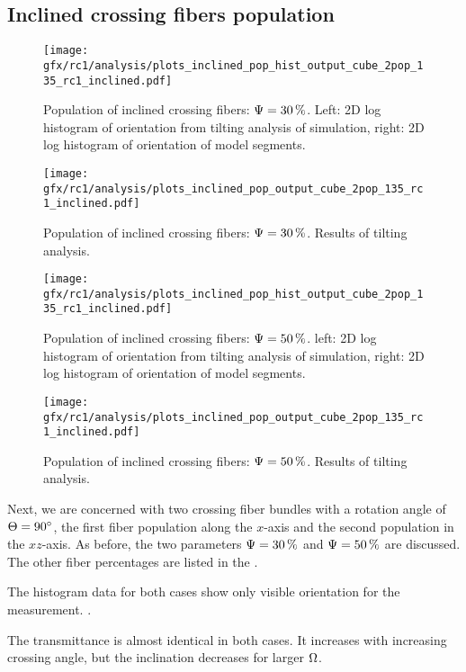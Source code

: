 \subsection{Inclined crossing fibers population}
\label{sec:resInclCross}
%
\begin{figure}[!t]
\centering
\texttt{[image: gfx/rc1/analysis/plots\_inclined\_pop\_hist\_output\_cube\_2pop\_135\_rc1\_inclined.pdf]}
\caption{Population of inclined crossing fibers: $\textnormal{$\Psi$}=\SI{30}{\percent}$. Left: 2D log histogram of orientation from tilting analysis of simulation, right: 2D log histogram of orientation of model segments.}
\label{fig:inclined_03_fiber_pop_hist}
\end{figure}
%
\begin{figure}[!p]
\centering
\texttt{[image: gfx/rc1/analysis/plots\_inclined\_pop\_output\_cube\_2pop\_135\_rc1\_inclined.pdf]}
\caption{Population of inclined crossing fibers: $\textnormal{$\Psi$}=\SI{30}{\percent}$. Results of tilting analysis.}
\label{fig:inclined_03_fiber_pop_rofl}
\end{figure}
%
\begin{figure}[!t]
\centering
\texttt{[image: gfx/rc1/analysis/plots\_inclined\_pop\_hist\_output\_cube\_2pop\_135\_rc1\_inclined.pdf]}
\caption{Population of inclined crossing fibers: $\textnormal{$\Psi$}=\SI{50}{\percent}$. left: 2D log histogram of orientation from tilting analysis of simulation, right: 2D log histogram of orientation of model segments.}
\label{fig:inclined_05_fiber_pop_hist}
\end{figure}
%
\begin{figure}[!p]
\centering
\texttt{[image: gfx/rc1/analysis/plots\_inclined\_pop\_output\_cube\_2pop\_135\_rc1\_inclined.pdf]}
\caption{Population of inclined crossing fibers: $\textnormal{$\Psi$}=\SI{50}{\percent}$. Results of tilting analysis.}
\label{fig:inclined_05_fiber_pop_rofl}
\end{figure}
%
Next, we are concerned with two crossing fiber bundles with a rotation angle of $\textnormal{$\Theta$} = \SI{90}{\degree}$, \ie{} the first fiber population along the $x$-axis and the second population in the $xz$-axis.
As before, the two parameters $\textnormal{$\Psi$} = \SI{30}{\percent}$ and $\textnormal{$\Psi$} = \SI{50}{\percent}$ are discussed.
The other fiber percentages are listed in the .
\par
%
The histogram data for both cases show only visible orientation for the measurement.
\dummy{}.
\par
The transmittance is almost identical in both cases.
It increases with increasing crossing angle, but the inclination decreases for larger $\textnormal{$\Omega$}$.
